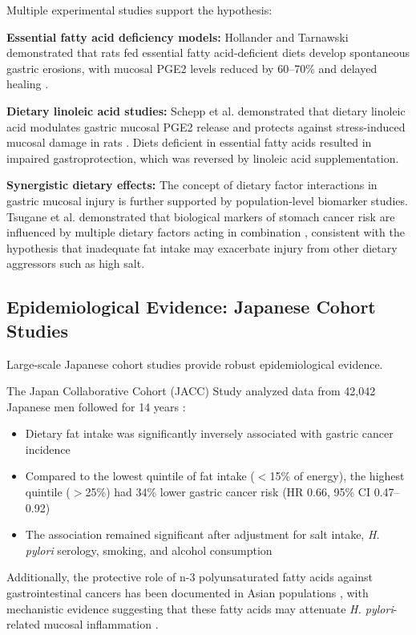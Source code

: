 \documentclass[review]{elsarticle}
\begin{document}
Multiple experimental studies support the hypothesis:

\textbf{Essential fatty acid deficiency models:} Hollander and Tarnawski demonstrated that rats fed essential fatty acid-deficient diets develop spontaneous gastric erosions, with mucosal PGE2 levels reduced by 60--70\% and delayed healing \cite{hollander1991}.

\textbf{Dietary linoleic acid studies:} Schepp et al. demonstrated that dietary linoleic acid modulates gastric mucosal PGE2 release and protects against stress-induced mucosal damage in rats \cite{schepp1988}. Diets deficient in essential fatty acids resulted in impaired gastroprotection, which was reversed by linoleic acid supplementation.

\textbf{Synergistic dietary effects:} The concept of dietary factor interactions in gastric mucosal injury is further supported by population-level biomarker studies. Tsugane et al. demonstrated that biological markers of stomach cancer risk are influenced by multiple dietary factors acting in combination \cite{tsugane1992}, consistent with the hypothesis that inadequate fat intake may exacerbate injury from other dietary aggressors such as high salt.

\subsection{Epidemiological Evidence: Japanese Cohort Studies}

Large-scale Japanese cohort studies provide robust epidemiological evidence.

The Japan Collaborative Cohort (JACC) Study analyzed data from 42,042 Japanese men followed for 14 years \cite{tokui2005}:

\begin{itemize}
    \item Dietary fat intake was significantly inversely associated with gastric cancer incidence
    \item Compared to the lowest quintile of fat intake ($<$15\% of energy), the highest quintile ($>$25\%) had 34\% lower gastric cancer risk (HR 0.66, 95\% CI 0.47--0.92)
    \item The association remained significant after adjustment for salt intake, \textit{H. pylori} serology, smoking, and alcohol consumption
\end{itemize}

Additionally, the protective role of n-3 polyunsaturated fatty acids against gastrointestinal cancers has been documented in Asian populations \cite{calder2015}, with mechanistic evidence suggesting that these fatty acids may attenuate \textit{H. pylori}-related mucosal inflammation \cite{wallace2008}.
\end{document}
